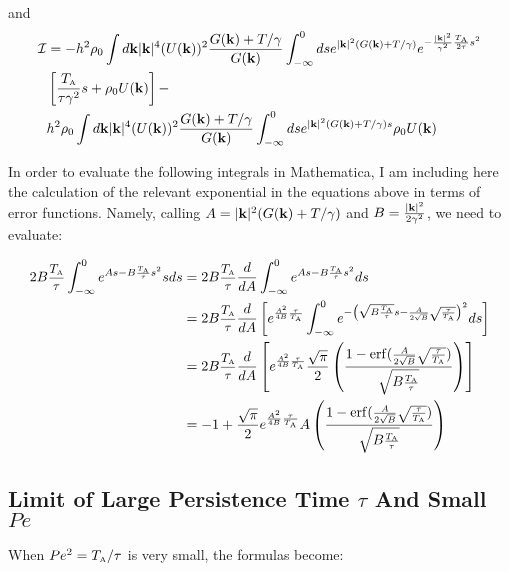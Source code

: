 \documentclass[amsmath,preprintnumbers,10pt,article,notitlepage]{revtex4-1}
\newcommand{\A}{\text{\tiny{A}}}
\DeclareMathOperator\erf{erf}
\def\smath#1{\text{\scalebox{0.9}{$#1$}}}
\def\sfrac#1#2{\smath{\frac{#1}{#2}}}
\begin{document}
and
\begin{align}\label{eq:final_expression_I_large_tau}
\mathcal{I} & =  - h^2 \rho_0 \int d{\bf k} |{\bf k}|^4 (U({\bf k}))^2 \dfrac{ G({\bf k}) + T/ \gamma}{G({\bf k})}
\int_{-\infty}^0 ds e^{|{\bf k}|^2 ( G({\bf k}) + T/ \gamma)} e^{-\frac{|{\bf k}|^2}{\gamma^2}\frac{T_\A}{2\tau}{s}^2} \nonumber\\
& \left[ \dfrac{T_\A}{\tau \gamma^2}s  + \rho_0 U({\bf k}) \right] - \nonumber \\
&h^2 \rho_0 \int d{\bf k} |{\bf k}|^4 (U({\bf k}))^2 \dfrac{ G({\bf k}) + T/ \gamma}{G({\bf k})}
\int_{-\infty}^0 ds e^{|{\bf k}|^2 ( G({\bf k}) + T/ \gamma)s} \rho_0 U({\bf k})
\end{align}


In order to evaluate the following integrals in Mathematica, I am including here the calculation of the relevant exponential in the equations above in terms of error functions.  Namely, calling $A =   |{\bf k}|^2 ( G({\bf k}) + T/ \gamma)$ and $B = \frac{|{\bf k}|^2}{2\gamma^2}$, we need to evaluate: 

\begin{align}\label{first_integral}
    2B\sfrac{T_\A}{\tau} \int_{-\infty}^0  e^{As-B\sfrac{T_\A}{\tau}s^2} s ds & = 
     2B\sfrac{T_\A}{\tau} \frac{d}{dA}\int_{-\infty}^0  e^{As-B\sfrac{T_\A}{\tau}s^2} ds \nonumber \\
     & =  2B\sfrac{T_\A}{\tau} \frac{d}{dA} \left[ e^{\sfrac{A^2}{4B}\sfrac{\tau}{T_\A}}\int_{-\infty}^0  e^{-\left(\sqrt{B\sfrac{T_\A}{\tau}}s-\sfrac{A}{2\sqrt{B}}\sqrt{\sfrac{\tau}{T_\A}}\right)^2} ds \right] \nonumber \\
    &  = 2B\sfrac{T_\A}{\tau} \frac{d}{dA} \left[ e^{\sfrac{A^2}{4B}\sfrac{\tau}{T_\A}} \dfrac{\sqrt{\pi}}{2} \left(\frac{1 - \erf(\sfrac{A}{2\sqrt{B}}\sqrt{\sfrac{\tau}{T_\A}})}{\sqrt{B\sfrac{T_\A}{\tau}}} \right) \right] \nonumber \\
    & =  - 1 + \dfrac{\sqrt{\pi}}{2} e^{\frac{A^2}{4B}\frac{\tau}{T_\A}} A\left(\frac{1 - \erf(\sfrac{A}{2\sqrt{B}}\sqrt{\sfrac{\tau}{T_\A}})}{\sqrt{B\sfrac{T_\A}{\tau}}} \right)
\end{align}


\subsection{Limit of Large Persistence Time $\tau$ And Small $Pe$}


When $Pe^2 = T_\A/\tau$ is very small, the formulas become:
\end{document}
